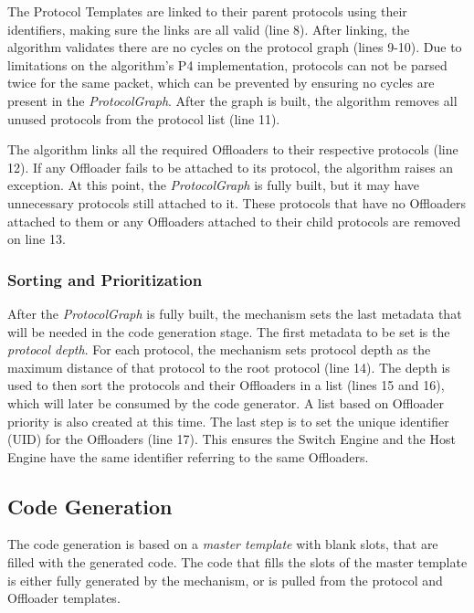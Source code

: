 The Protocol Templates are linked to their parent protocols using their identifiers, making sure the links are all valid (line 8). After linking, the algorithm validates there are no cycles on the protocol graph (lines 9-10). Due to limitations on the algorithm's P4 implementation, protocols can not be parsed twice for the same packet, which can be prevented by ensuring no cycles are present in the \textit{ProtocolGraph}. After the graph is built, the algorithm removes all unused protocols from the protocol list (line 11).

The algorithm links all the required Offloaders to their respective protocols (line 12). If any Offloader fails to be attached to its protocol, the algorithm raises an exception. At this point, the \textit{ProtocolGraph} is fully built, but it may have unnecessary protocols still attached to it. These protocols that have no Offloaders attached to them or any Offloaders attached to their child protocols are removed on line 13.

\subsubsection*{Sorting and Prioritization}

After the \textit{ProtocolGraph} is fully built, the mechanism sets the last metadata that will be needed in the code generation stage. The first metadata to be set is the \textit{protocol depth}. For each protocol, the mechanism sets protocol depth as the maximum distance of that protocol to the root protocol (line 14). The depth is used to then sort the protocols and their Offloaders in a list (lines 15 and 16), which will later be consumed by the code generator. A list based on Offloader priority is also created at this time. The last step is to set the unique identifier (UID) for the Offloaders (line 17). This ensures the Switch Engine and the Host Engine have the same identifier referring to the same Offloaders.

\subsection{Code Generation}

The code generation is based on a \textit{master template} with blank slots, that are filled with the generated code. The code that fills the slots of the master template is either fully generated by the mechanism, or is pulled from the protocol and Offloader templates.

